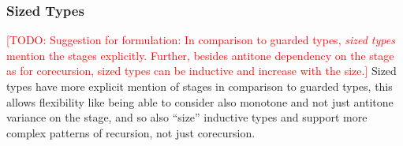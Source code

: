 \documentclass{book}
\newcommand{\TODO}[1]{\textcolor{red}{[TODO: #1]}}
\begin{document}




\subsubsection{Sized Types}

\TODO{Suggestion for formulation:
In comparison to guarded types, \emph{sized types} mention the stages
explicitly.  Further, besides antitone dependency on the stage as for
corecursion, sized types can be inductive and increase with the size.}
Sized types have more explicit mention of stages in comparison to
guarded types, this allows flexibility like being able to consider
also monotone and not just antitone variance on the stage, and so also
``size'' inductive types and support more complex patterns of
recursion, not just corecursion.
\end{document}
